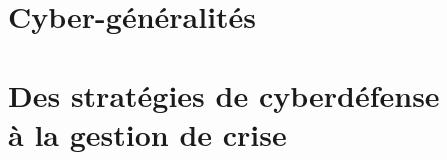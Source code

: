 

\part{Cyber-généralités}



%



\part[Sécurité opérationnelle]{Des stratégies de cyberdéfense \\à la gestion de crise}

